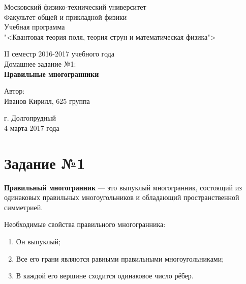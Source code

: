 \documentclass[12pt]{article}
\DeclareMathOperator{\Sum}{\mathop{Sum}}
\begin{document}
\begin{titlepage}		
\begin{center}
\large 	Московский физико-технический университет \\
Факультет общей и прикладной физики \\
\vspace{0.2cm}
Учебная программа\\
"<Квантовая теория поля, теория струн и математическая физика">

\vspace{4.5cm}
II семестр 2016-2017 учебного года \\
\large Домашнее задание №1: \\ \vspace{0.1cm}
\LARGE \textbf{Правильные многогранники}
\end{center}
\vspace{2.3cm} \large

\begin{center}
		 Автор: \\
 Иванов Кирилл,
 625 группа
\vspace{10mm}


\end{center}

\begin{center} \vspace{50mm}
г. Долгопрудный \\ 
4 марта 2017 года
\end{center}
\end{titlepage}


\section{Задание №1}

\textbf{Правильный многогранник }— это выпуклый многогранник, состоящий из одинаковых правильных многоугольников и обладающий пространственной симметрией.  \par 

Необходимые свойства правильного многогранника: 
\begin{enumerate}

\item Он выпуклый;
\item Все его грани являются равными правильными многоугольниками;
\item В каждой его вершине сходится одинаковое число рёбер.

\end{enumerate}
\end{document}
